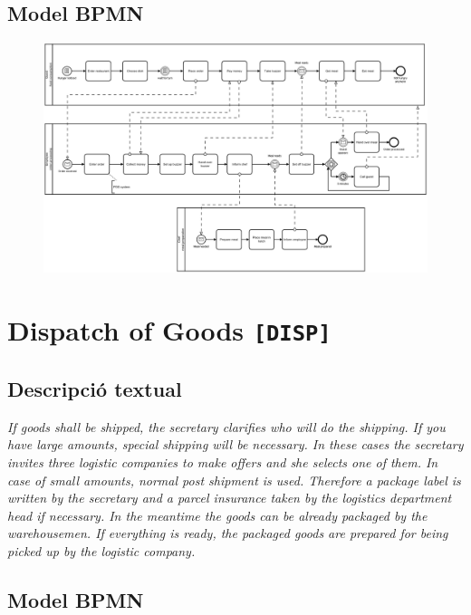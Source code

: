 \subsection*{Model BPMN}

\begin{figure}[!h]
    \centering
    \includegraphics[width=\textwidth]{figures/benchmark/Self-service-restaurant.png}
\end{figure}

\clearpage

\section{Dispatch of Goods \texttt{[DISP]}}

\subsection*{Descripció textual}

\textit{If goods shall be shipped, the secretary clarifies who will do the shipping. If you have large amounts, special shipping will be necessary. In these cases the secretary invites three logistic companies to make offers and she selects one of them. In case of small amounts, normal post shipment is used. Therefore a package label is written by the secretary and a parcel insurance taken by the logistics department head if necessary. In the meantime the goods can be already packaged by the warehousemen. If everything is ready, the packaged goods are prepared for being picked up by the logistic company.}


\subsection*{Model BPMN}

